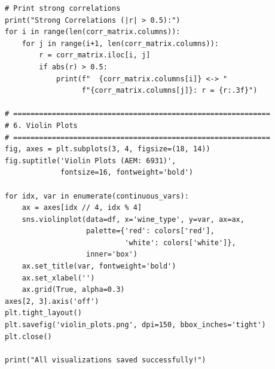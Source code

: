 \documentclass[12pt,a4paper]{article}
\begin{document}
\begin{lstlisting}
# Print strong correlations
print("Strong Correlations (|r| > 0.5):")
for i in range(len(corr_matrix.columns)):
    for j in range(i+1, len(corr_matrix.columns)):
        r = corr_matrix.iloc[i, j]
        if abs(r) > 0.5:
            print(f"  {corr_matrix.columns[i]} <-> "
                  f"{corr_matrix.columns[j]}: r = {r:.3f}")

# ============================================================
# 6. Violin Plots
# ============================================================
fig, axes = plt.subplots(3, 4, figsize=(18, 14))
fig.suptitle('Violin Plots (AEM: 6931)',
             fontsize=16, fontweight='bold')

for idx, var in enumerate(continuous_vars):
    ax = axes[idx // 4, idx % 4]
    sns.violinplot(data=df, x='wine_type', y=var, ax=ax,
                   palette={'red': colors['red'],
                            'white': colors['white']},
                   inner='box')
    ax.set_title(var, fontweight='bold')
    ax.set_xlabel('')
    ax.grid(True, alpha=0.3)
axes[2, 3].axis('off')
plt.tight_layout()
plt.savefig('violin_plots.png', dpi=150, bbox_inches='tight')
plt.close()

print("All visualizations saved successfully!")
\end{lstlisting}
\end{document}
